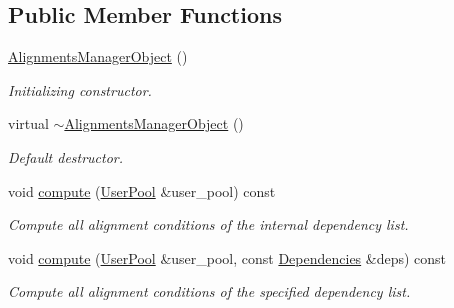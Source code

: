 \subsection*{Public Member Functions}
\begin{DoxyCompactItemize}
\item 
\hyperlink{class_d_d4hep_1_1_alignments_1_1_alignments_manager_object_a8fb4e0202704fdcf8101a42494deca7b}{Alignments\+Manager\+Object} ()
\begin{DoxyCompactList}\small\item\em Initializing constructor. \end{DoxyCompactList}\item 
virtual \hyperlink{class_d_d4hep_1_1_alignments_1_1_alignments_manager_object_a4eb2f5609448d4e70e2cab1b33311f96}{$\sim$\+Alignments\+Manager\+Object} ()
\begin{DoxyCompactList}\small\item\em Default destructor. \end{DoxyCompactList}\item 
void \hyperlink{class_d_d4hep_1_1_alignments_1_1_alignments_manager_object_a2887ad4a43e73c3632d0e3b45c62ba30}{compute} (\hyperlink{class_d_d4hep_1_1_conditions_1_1_user_pool}{User\+Pool} \&user\+\_\+pool) const
\begin{DoxyCompactList}\small\item\em Compute all alignment conditions of the internal dependency list. \end{DoxyCompactList}\item 
void \hyperlink{class_d_d4hep_1_1_alignments_1_1_alignments_manager_object_a87b8168925305197cf28ae760e8a86b5}{compute} (\hyperlink{class_d_d4hep_1_1_conditions_1_1_user_pool}{User\+Pool} \&user\+\_\+pool, const \hyperlink{class_d_d4hep_1_1_alignments_1_1_alignments_manager_object_a833ee244e731bbe8cf28bb209181dabc}{Dependencies} \&deps) const
\begin{DoxyCompactList}\small\item\em Compute all alignment conditions of the specified dependency list. \end{DoxyCompactList}\end{DoxyCompactItemize}
